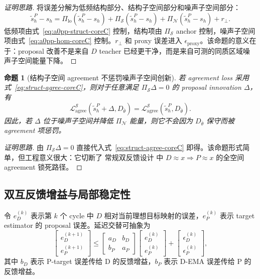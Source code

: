 \documentclass[11pt,a4paper,UTF8,fontset=fandol]{ctexart}
\newtheorem{proposition}[theorem]{命题}
\theoremstyle{definition}
\begin{document}
\begin{proof}[证明思路]
将误差分解为低频结构部分、结构子空间部分和噪声子空间部分：
\begin{equation}
    \tilde s_h^P-s_h
    =\Pi_{\mathrm{lo}}(\tilde s_h^P-s_h)
    +\Pi_{\mathcal S}(\tilde s_h^P-s_h)
    +\Pi_{\mathcal N}(\tilde s_h^P-s_h)
    +r_{\perp}.
\end{equation}
低频项由式~\eqref{eq:a0pp-struct-coreC} 控制，结构项由 $\Pi_{\mathcal S}$ anchor 控制，噪声子空间项由式~\eqref{eq:a0pp-hom-coreC} 控制。$r_\perp$ 和 proxy 误差进入 $\epsilon_{\mathrm{proxy}}$。该命题的意义在于：proposal 改善不是来自 $D$ teacher 已经更干净，而是来自可测的同质区域噪声子空间能量下降。
\end{proof}

\begin{proposition}[结构子空间 agreement 不惩罚噪声子空间创新]
\label{prop:struct-agree-coreC}
若 agreement loss 采用式~\eqref{eq:struct-agree-coreC}，则对于任意满足 $\Pi_{\mathcal S}\Delta=0$ 的 proposal innovation $\Delta$，有
\begin{equation}
    \mathcal L_{\mathrm{agree}}^{\mathcal S}(\tilde s_h^P+\Delta,D_{\bar\theta})
    =
    \mathcal L_{\mathrm{agree}}^{\mathcal S}(\tilde s_h^P,D_{\bar\theta}).
\end{equation}
因此，若 $\Delta$ 位于噪声子空间并降低 $\Pi_{\mathcal N}$ 能量，则它不会因为 $D_{\bar\theta}$ 保守而被 agreement 项惩罚。
\end{proposition}

\begin{proof}[证明思路]
由 $\Pi_{\mathcal S}\Delta=0$ 直接代入式~\eqref{eq:struct-agree-coreC} 即得。该命题形式简单，但工程意义很大：它切断了 常规双反馈设计 中 $D\approx x\Rightarrow P\approx x$ 的全空间 agreement 锁死路径。
\end{proof}

\subsection{双互反馈增益与局部稳定性}

令 $e_D^{(k)}$ 表示第 $k$ 个 cycle 中 $D$ 相对当前理想目标映射的误差，$e_P^{(k)}$ 表示 target estimator 的 proposal 误差。延迟交替可抽象为
\begin{equation}
\label{eq:dual-feedback-recurrence-coreB}
\begin{bmatrix}
    e_D^{(k+1)}\\ e_P^{(k+1)}
\end{bmatrix}
\le
\begin{bmatrix}
    a_D & b_D\\ b_P & a_P
\end{bmatrix}
\begin{bmatrix}
    e_D^{(k)}\\ e_P^{(k)}
\end{bmatrix}
+
\begin{bmatrix}
    \epsilon_D^{(k)}\\ \epsilon_P^{(k)}
\end{bmatrix},
\end{equation}
其中 $b_D$ 表示 P-target 误差传给 D 的反馈增益，$b_P$ 表示 D-EMA 误差传给 P 的反馈增益。
\end{document}
